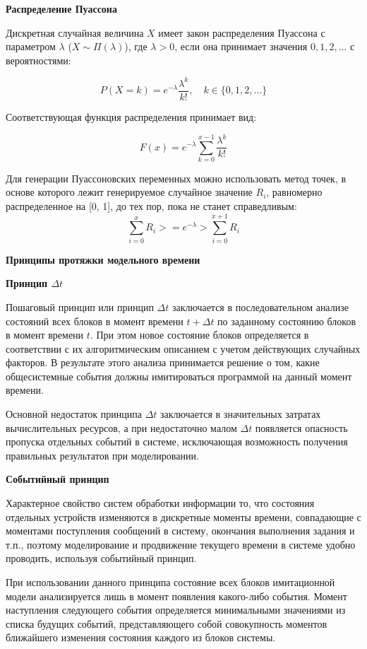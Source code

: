 \textbf{Распределение Пуассона}

Дискретная случайная величина $X$ имеет закон распределения Пуассона с параметром $\lambda$ ($X \sim \Pi(\lambda)$), где $\lambda > 0$, если она принимает значения $0, 1, 2,...$ с вероятностями:

\begin{equation}
	P(X = k)= e^{-\lambda}\frac{\lambda^{k}}{k!}, \quad k \in \{0, 1, 2, ...\}
\end{equation}

Соответствующая функция распределения принимает вид:

\begin{equation}
	F(x) = e^{-\lambda}\sum_{k=0}^{x-1}\frac{\lambda^{k}}{k!} 
\end{equation}

Для генерации Пуассоновских переменных можно использовать метод точек, в основе
которого лежит генерируемое случайное значение $R_i$, равномерно распределенное на
[0, 1], до тех пор, пока не станет справедливым:
\begin{equation}
	\sum_{i=0}^{x}{R_i} >= e^{-\lambda} > \sum_{i=0}^{x + 1}{R_i}
\end{equation}

\textbf{Принципы протяжки модельного времени}

\textbf{Принцип $\Delta t$}

Пошаговый принцип или принцип $\Delta t$ заключается в последовательном анализе
состояний всех блоков в момент времени $t + \Delta t$ по заданному состоянию
блоков в момент времени $t$. При этом новое состояние блоков определяется в
соответствии с их алгоритмическим описанием с учетом действующих случайных
факторов. В результате этого анализа принимается решение о том, какие
общесистемные события должны имитироваться программой на данный момент времени.

Основной недостаток принципа $\Delta t$ заключается в значительных затратах
вычислительных ресурсов, а при недостаточно малом $\Delta t$ появляется
опасность пропуска отдельных событий в системе, исключающая возможность
получения правильных результатов при моделировании.

\textbf{Событийный принцип}

Характерное свойство систем обработки информации то, что состояния отдельных устройств изменяются в дискретные моменты времени,
совпадающие с моментами поступления сообщений в систему, окончания выполнения
задания и т.п., поэтому моделирование и продвижение текущего времени в системе удобно
проводить, используя событийный принцип.

При использовании данного принципа состояние всех блоков имитационной модели
анализируется лишь в момент появления какого-либо события. Момент наступления
следующего события определяется минимальными значениями из списка будущих
событий, представляющего собой совокупность моментов ближайшего изменения состояния каждого из блоков
системы.

